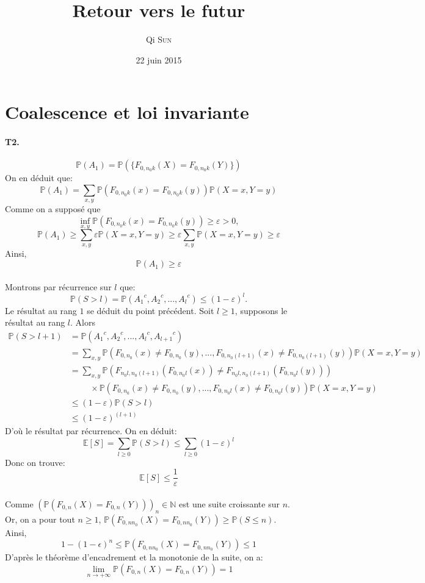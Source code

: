 \documentclass[11pt,a4paper,french]{article}
\title{Retour vers le futur}
\author{Qi \textsc{Sun}}
\date{22 juin 2015}%
\begin{document}
\maketitle

\tableofcontents
\clearpage

\section{Coalescence et loi invariante}

\paragraph{T2.}

\[\mathbb{P}(A_1)=\mathbb{P}(\{F_{0,{n_0}k}(X)=F_{0,{n_0}k}(Y)\})\]
On en déduit que:
\[ \mathbb{P}(A_1)=\sum_{x,y} \mathbb{P}(F_{0,{n_0}k}(x)=F_{0,{n_0}k}(y))\mathbb{P}(X=x,Y=y)\]
Comme on a supposé que 
\[\inf_{x,y}\mathbb{P}(F_{0,{n_0}k}(x)=F_{0,{n_0}k}(y))\geq\varepsilon>0,\]
\[ \mathbb{P}(A_1)\geq\sum_{x,y} \varepsilon\mathbb{P}(X=x,Y=y)\geq\varepsilon\sum_{x,y}\mathbb{P}(X=x,Y=y)\geq\varepsilon\]
Ainsi,
\[ \mathbb{P}(A_1)\geq\varepsilon\]
\\
Montrons par récurrence sur $l$ que:
\[ \mathbb{P}(S>l)=\mathbb{P}({A_1}^c,{A_2}^c,...,{A_l}^c)\le(1-\varepsilon)^l. \]
Le résultat au rang $1$ se déduit du point précédent.
Soit $l\geq1$, supposons le résultat au rang $l$. Alors
\begin{equation*}
\begin{split}
\mathbb{P}(S>l+1)&=\mathbb{P}({A_1}^c,{A_2}^c,...,{A_l}^c,{A_{l+1}}^c)\\
&=\sum_{x,y} \mathbb{P}(F_{0,n_0}(x)\neq F_{0,n_0}(y),...,F_{0,{n_0}(l+1)}(x)\neq F_{0,{n_0}(l+1)}(y))\mathbb{P}(X=x,Y=y)\\
&=\sum_{x,y} \mathbb{P}(F_{n_0l,n_0(l+1)}(F_{0,{n_0}l}(x))\neq F_{n_0l,n_0(l+1)}(F_{0,{n_0}l}(y))) \\
&\hspace{1cm}\times\mathbb{P}(F_{0,n_0}(x)\neq F_{0,n_0}(y),...,F_{0,{n_0}l}(x)\neq F_{0,{n_0}l}(y))\mathbb{P}(X=x,Y=y)\\
&\leq (1-\varepsilon)\mathbb{P}(S>l)\\
&\leq (1-\varepsilon)^{(l+1)}
\end{split}
\end{equation*}
D'où le résultat par récurrence.
On en déduit:
\[\mathbb{E}[S]=\sum_{l\geq0}\mathbb{P}(S>l)\leq\sum_{l\geq0}(1-\varepsilon)^l\]
Donc on trouve:
\[\mathbb{E}[S]\leq\frac{1}{\varepsilon}\]
\\
Comme $(\mathbb{P}(F_{0,n}(X)=F_{0,n}(Y)))_n\in \mathbb{N}$ est une suite croissante sur $n$.\\
Or, on a pour tout $n\geq 1$, $\mathbb{P}(F_{0,nn_0}(X)=F_{0,nn_0}(Y))\geq\mathbb{P}(S\leq n)$.\\
Ainsi,
\[1-(1-\epsilon)^n\leq\mathbb{P}(F_{0,nn_0}(X)=F_{0,nn_0}(Y))\leq1\]
D'après le théorème d'encadrement et la monotonie de la suite, on a:
\[\lim\limits_{n \rightarrow +\infty} \mathbb{P}(F_{0,n}(X)=F_{0,n}(Y)) = 1\]
\end{document}
